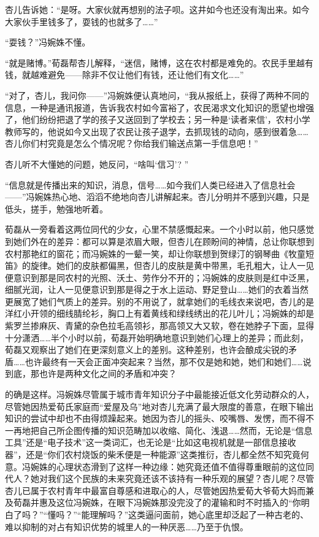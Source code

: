 \par 杏儿告诉她：“是呀。大家伙就再想别的法子呗。这井如今也还没有淘出来。如今大家伙手里钱多了，耍钱的也就多了……”
\par “耍钱？”冯婉姝不懂。
\par “就是赌博。”荀磊帮杏儿解释，“迷信，赌博，这在农村都是难免的。农民手里越有钱，就越难避免——除非不仅让他们有钱，还让他们有文化……”
\par “对了，杏儿，我问你——”冯婉姝便认真地问，“我从报纸上，获得了两种不同的信息，一种是通讯报道，告诉我农村如今富裕了，农民渴求文化知识的愿望也增强了，他们纷纷把退了学的孩子又送回到了学校去；另一种是‘读者来信’，农村小学教师写的，他说如今又出现了农民让孩子退学，去抓现钱的动向，感到很着急……杏儿你们村究竟是怎么个情况呢？你给我们输送点第一手信息吧！”
\par 杏儿听不大懂她的问题，她反问，“啥叫‘信习’? ”
\par “信息就是传播出来的知识，消息，信号……如今我们人类已经进入了信息社会——”冯婉姝热心地、滔滔不绝地向杏儿讲解起来。杏儿分明并不感到兴趣，只是低头，搓手，勉强地听着。
\par 荀磊从一旁看着这两位同代的少女，心里不禁感慨起来。一个小时以前，他只感觉到她们外在的差异：都可以算是浓眉大眼，但杏儿在顾盼间的神情，总让你联想到农村那艳红的窗花；而冯婉姝的一颦一笑，却让你联想到贺绿汀的钢琴曲《牧童短笛》的旋律。她们的皮肤都偏黑，但杏儿的皮肤是黄中带黑，毛孔粗大，让人一见便意识到那是同农村的光照、沃土、劳作分不开的；冯婉姝的皮肤则是红中泛黑，细腻光润，让人一见便意识到那是得之于水上运动、野足登山……她们的衣着当然更展宽了她们气质上的差异。别的不用说了，就拿她们的毛线衣来说吧，杏儿的是洋红小开领的细线腈纶衫，胸口上有着黄线和绿线绣出的花儿叶儿；冯婉姝的却是紫罗兰掺麻灰、青黛的杂色拉毛高领衫，那高领又大又软，卷在她脖子下面，显得十分潇洒……半个小时以前，荀磊开始明确地意识到她们心理上的差异；而此刻，荀磊又观察出了她们在更深刻意义上的差别。这种差别，也许会酿成尖锐的矛盾……也许最终有一天会正面冲突起来？当然，那不仅是她和她，她们和她们……说到底，那也许是两种文化之间的矛盾和冲突？
\par 的确是这样。冯婉姝尽管属于城市青年知识分子中最能接近低文化劳动群众的人，尽管她因热爱荀氏家庭而“爱屋及乌”地对杏儿充满了最大限度的善意，在眼下输出知识的尝试中却也不由得烦躁起来。她因为杏儿的摇头、咬嘴唇、发愣，而不得不一再地把自己所企图传播的知识范畴加以收缩、简化、浅退……然而，无论是“信息工具”还是“电子技术”这一类词汇，也无论是“比如这电视机就是一部信息接收器”，还是“你们农村烧饭的柴禾便是一种能源”这类推衍，杏儿都全然不知究竟何意。冯婉姝的心理状态滑到了这样一种边缘：她究竟还值不值得尊重眼前的这位同代人？她对我们这个民族的未来究竟还该不该持有一种乐观的展望？杏儿呢？尽管杏儿已属于农村青年中最富自尊感和进取心的人，尽管她因热爱荀大爷荀大妈而兼及荀磊并惠及这位冯婉姝，在眼下冯婉姝那没完没了的灌输和时不时插入的“你明白了吗？”“懂吗？”“能理解吗？”这类逼问面前，她心底里却泛起了一种古老的、难以抑制的对占有知识优势的城里人的一种厌恶……乃至于仇恨。
